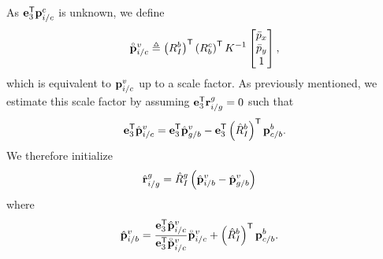 As $\boldsymbol{\mathrm{e}}_3^{\mathsf{T}} \boldsymbol{\mathrm{p}}_{i/c}^c$ is unknown, we define 
\begin{equation}
  \accentset{\circ}{\boldsymbol{\mathrm{p}}}_{i/c}^v
  \triangleq
   \left( R_I^b
  \right)^{\mathsf{T}} \left( R_b^c \right)^{\mathsf{T}} K^{-1} \begin{bmatrix}
    \bar{p}_x \\ \bar{p}_y \\ 1
  \end{bmatrix},
\end{equation}
which is equivalent to $\boldsymbol{\mathrm{p}}_{i/c}^v$ up to a scale factor. As previously
mentioned, we estimate this scale factor by assuming $\boldsymbol{\mathrm{e}}_3^{\mathsf{T}}
\boldsymbol{\mathrm{r}}_{i/g}^g = 0$ such that
\begin{equation}
  \boldsymbol{\mathrm{e}}_3^{\mathsf{T}} \hat{\boldsymbol{\mathrm{p}}}_{i/c}^v = \boldsymbol{\mathrm{e}}_3^{\mathsf{T}} \hat{\boldsymbol{\mathrm{p}}}_{g/b}^v -
  \boldsymbol{\mathrm{e}}_3^{\mathsf{T}} \left( \hat{R}_I^b \right)^{\mathsf{T}} \boldsymbol{\mathrm{p}}_{c/b}^b.
\end{equation}
We therefore initialize
\begin{align}
    \hat{\boldsymbol{\mathrm{r}}}_{i/g}^g &= \hat{R}_I^g \left( \hat{\boldsymbol{\mathrm{p}}}_{i/b}^v -
    \hat{\boldsymbol{\mathrm{p}}}_{g/b}^v \right)
\end{align}
where
\begin{align}
    \hat{\boldsymbol{\mathrm{p}}}_{i/b}^v &= \frac{\boldsymbol{\mathrm{e}}_3^{\mathsf{T}}
  \hat{\boldsymbol{\mathrm{p}}}_{i/c}^v}{\boldsymbol{\mathrm{e}}_3^{\mathsf{T}} \accentset{\circ}{\boldsymbol{\mathrm{p}}}_{i/c}^v}
  \accentset{\circ}{\boldsymbol{\mathrm{p}}}_{i/c}^v+ \left( \hat{R}_I^b \right)^{\mathsf{T}}
  \boldsymbol{\mathrm{p}}_{c/b}^b.
\end{align}

